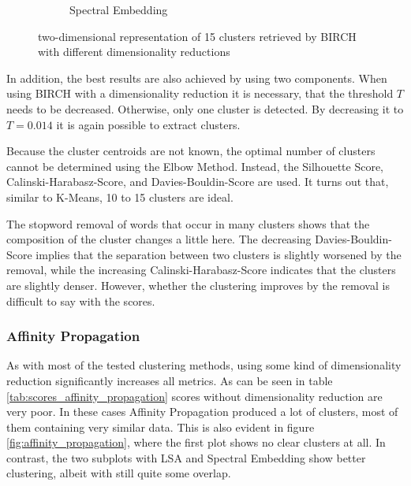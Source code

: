 \begin{figure}
\begin{subfigure}{.3\textwidth}
  \caption{Spectral Embedding}
  \label{fig:birch_spectral}
\end{subfigure}
\caption{two-dimensional representation of 15 clusters retrieved by BIRCH with different dimensionality reductions}
\label{fig:birch}
\end{figure}
In addition, the best results are also achieved by using two components.
When using BIRCH with a dimensionality reduction it is necessary, that the threshold $T$ needs to be decreased.
Otherwise, only one cluster is detected.
By decreasing it to $T=0.014$ it is again possible to extract clusters.

Because the cluster centroids are not known, the optimal number of clusters cannot be determined using the Elbow Method.
Instead, the Silhouette Score, Calinski-Harabasz-Score, and Davies-Bouldin-Score are used.
It turns out that, similar to K-Means, 10 to 15 clusters are ideal.

The stopword removal of words that occur in many clusters shows that the composition of the cluster changes a little here.
The decreasing Davies-Bouldin-Score implies that the separation between two clusters is slightly worsened by the removal, while the increasing Calinski-Harabasz-Score indicates that the clusters are slightly denser.
However, whether the clustering improves by the removal is difficult to say with the scores.

\subsubsection{Affinity Propagation}

As with most of the tested clustering methods, using some kind of dimensionality reduction significantly increases all metrics. As can be seen in table \ref{tab:scores_affinity_propagation} scores without dimensionality reduction are very poor.
In these cases Affinity Propagation produced a lot of clusters, most of them containing very similar data. This is also evident in figure \ref{fig:affinity_propagation}, where the first plot shows no clear clusters at all. In contrast, the two subplots with LSA and Spectral Embedding show better clustering, albeit with still quite some overlap. 

